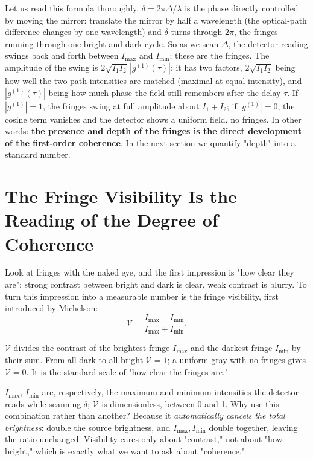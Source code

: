 Let us read this formula thoroughly. \(\delta=2\pi\Delta/\lambda\) is the phase directly controlled by moving the mirror: translate the mirror by half a wavelength (the optical-path difference changes by one wavelength) and \(\delta\) turns through \(2\pi\), the fringes running through one bright-and-dark cycle. So as we scan \(\Delta\), the detector reading swings back and forth between \(I_{\max}\) and \(I_{\min}\); these are the fringes. The amplitude of the swing is \(2\sqrt{I_1 I_2}\,|g^{(1)}(\tau)|\): it has two factors, \(2\sqrt{I_1I_2}\) being how well the two path intensities are matched (maximal at equal intensity), and \(|g^{(1)}(\tau)|\) being how much phase the field still remembers after the delay \(\tau\). If \(|g^{(1)}|=1\), the fringes swing at full amplitude about \(I_1+I_2\); if \(|g^{(1)}|=0\), the cosine term vanishes and the detector shows a uniform field, no fringes. In other words: \textbf{the presence and depth of the fringes is the direct development of the first-order coherence}. In the next section we quantify "depth" into a standard number.

\section{The Fringe Visibility Is the Reading of the Degree of Coherence}
\label{sec:e09-visibility}

Look at fringes with the naked eye, and the first impression is "how clear they are": strong contrast between bright and dark is clear, weak contrast is blurry. To turn this impression into a measurable number is the fringe visibility, first introduced by Michelson:
\begin{equation}
  \mathcal V=\frac{I_{\max}-I_{\min}}{I_{\max}+I_{\min}} .
  \label{eq:e09-visibility-def}
\end{equation}
\begin{formulaexplain}
\(\mathcal V\) divides the contrast of the brightest fringe \(I_{\max}\) and the darkest fringe \(I_{\min}\) by their sum. From all-dark to all-bright \(\mathcal V=1\); a uniform gray with no fringes gives \(\mathcal V=0\). It is the standard scale of "how clear the fringes are."
\end{formulaexplain}
\(I_{\max}\), \(I_{\min}\) are, respectively, the maximum and minimum intensities the detector reads while scanning \(\delta\); \(\mathcal V\) is dimensionless, between 0 and 1. Why use this combination rather than another? Because it \emph{automatically cancels the total brightness}: double the source brightness, and \(I_{\max},I_{\min}\) double together, leaving the ratio unchanged. Visibility cares only about "contrast," not about "how bright," which is exactly what we want to ask about "coherence."

